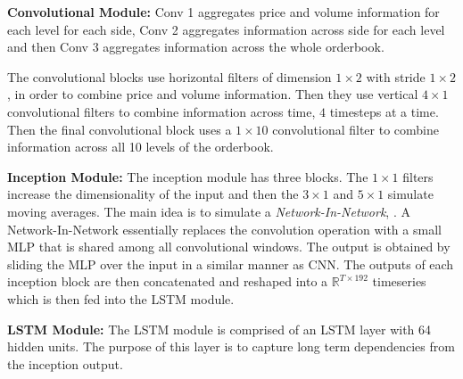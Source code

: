 \documentclass[a4paper, oneside, notitlepage]{book}
\begin{document}
\begin{multicols}{2}
\textbf{Convolutional Module:}
Conv 1 aggregates price and volume information for each level for each side,
Conv 2 aggregates information across side for each level and then
Conv 3 aggregates information across the whole orderbook.

The convolutional blocks use horizontal filters of dimension $1 \times 2$ with stride $1 \times 2$, in order
to combine price and volume information. Then they use vertical $4 \times 1$ convolutional filters to combine
information across time, $4$ timesteps at a time. Then the final convolutional block uses a $1 \times 10$ convolutional
filter to combine information across all 10 levels of the orderbook.

\textbf{Inception Module:}
The inception module has three blocks. The $1 \times 1$ filters increase the dimensionality of
the input and then the $3 \times 1$ and $5 \times 1$ simulate moving averages.
The main idea is to simulate a \textit{Network-In-Network}, \cite{MIN2014}.
A Network-In-Network essentially replaces the convolution operation with a small MLP
that is shared among all convolutional windows. The output is obtained by sliding the MLP
over the input in a similar manner as CNN.
The outputs of each inception block are then concatenated and reshaped into a $\mathbb{R}^{T \times 192}$ timeseries
which is then fed into the LSTM module.

\textbf{LSTM Module:}
The LSTM module is comprised of an LSTM layer with 64 hidden units. The purpose
of this layer is to capture long term dependencies from the inception output.


\end{multicols}
\end{document}
